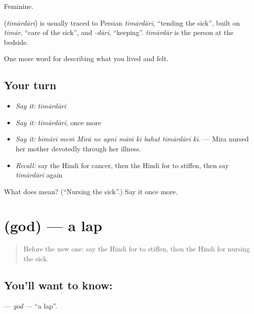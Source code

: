 Feminine.

\begin{cousinweb}
\textbf{} (\emph{tīmārdārī}) is usually traced to Persian \emph{tīmārdārī}, \textquotedblleft{}tending the sick\textquotedblright{}, built on \emph{tīmār}, \textquotedblleft{}care of the sick\textquotedblright{}, and \emph{-dārī}, \textquotedblleft{}keeping\textquotedblright{}. \emph{tīmārdār} is the person at the bedside.
\end{cousinweb}

\begin{grammarlens}[title={What you've built}]
One more word for describing what you lived and felt.
\end{grammarlens}

\subsection*{Your turn}
\begin{itemize}
\raggedright
  \item \emph{Say it:} \emph{tīmārdārī}
  \item \emph{Say it:} \emph{tīmārdārī}, once more
  \item \emph{Say it:} \emph{bīmārī meṁ Mīrā ne apnī māṁ kī bahut tīmārdārī kī.} — Mira nursed her mother devotedly through her illness.
  \item \emph{Recall:} say the Hindi for cancer, then the Hindi for to stiffen, then say \emph{tīmārdārī} again
\end{itemize}

\begin{tcolorbox}[breakable,colback=teal!4,colframe=teal!35!black,title={Before you move on}]
What does  mean? (\textquotedblleft{}Nursing the sick\textquotedblright{}.) Say it once more.
\end{tcolorbox}
\section[\texorpdfstring{\hi{गोद} (god)}{गोद (god)}]{ (god) — a lap}

\label{lesson:HI-C494-god}



\begin{quote}
Before the new one: say the Hindi for to stiffen, then the Hindi for nursing the sick.
\end{quote}

\subsection*{You'll want to know: }
\textbf{} — \emph{god} — \textquotedblleft{}a lap\textquotedblright{}.

